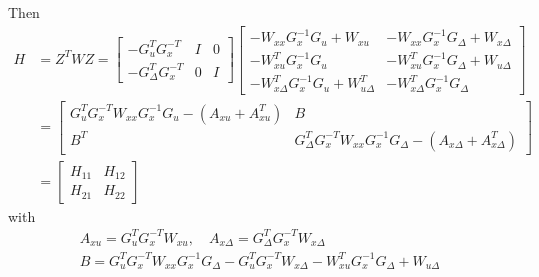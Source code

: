 \documentclass{article}
\begin{document}
Then 
\[
\begin{aligned}
H &= Z^TWZ = \left[ \begin{matrix}-G_u^TG_x^{-T}&I&0 \\-G_\Delta^TG_x^{-T} &0&I \end{matrix}\right] \left[\begin{matrix} -W_{xx}G_x^{-1}G_u+W_{xu} & -W_{xx}G_x^{-1}G_\Delta+W_{x\Delta}\\-W_{xu}^TG_x^{-1}G_u &-W_{xu}^TG_x^{-1}G_\Delta +W_{u\Delta} \\ -W_{x\Delta}^TG_x^{-1}G_u +W_{u\Delta}^T & -W_{x\Delta}^TG_x^{-1}G_\Delta \end{matrix}\right] \\&=
\left[ \begin{matrix} 
G_u^TG_x^{-T}W_{xx}G_x^{-1}G_u- (A_{xu}+A^T_{xu}) 
& B
\\ B^T &G_\Delta^TG_x^{-T}W_{xx}G_x^{-1}G_\Delta-(A_{x\Delta}+A_{x\Delta}^T) 
\end{matrix}\right] \\
& = \left[\begin{matrix}
H_{11} & H_{12} \\
H_{21} & H_{22}
\end{matrix}\right]
\end{aligned}
\]
with 
\[
\begin{aligned}
A_{xu}=G_u^TG_x^{-T}W_{xu},\quad A_{x\Delta}=G_\Delta^TG_x^{-T}W_{x\Delta}\\
B = G_u^TG_x^{-T}W_{xx}G_x^{-1}G_\Delta -G_u^TG_x^{-T}W_{x\Delta}-W^T_{xu}G^{-1}_xG_\Delta+W_{u\Delta}
\end{aligned}
\]
\end{document}
